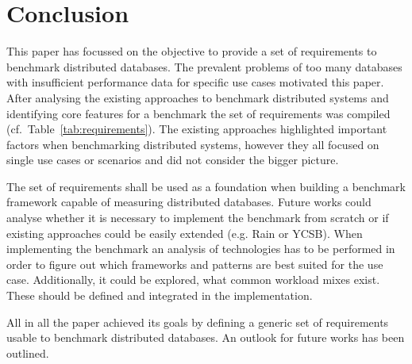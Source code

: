 
\chapter{Conclusion}
\label{cha:conclusion}
This paper has focussed on the objective to provide a set of requirements to benchmark distributed databases. The prevalent problems of too many databases with insufficient performance data for specific use cases motivated this paper. After analysing the existing approaches to benchmark distributed systems and identifying core features for a benchmark the set of requirements was compiled (cf.~Table~\ref{tab:requirements}). The existing approaches highlighted important factors when benchmarking distributed systems, however they all focused on single use cases or scenarios and did not consider the bigger picture.

The set of requirements shall be used as a foundation when building a benchmark framework capable of measuring distributed databases. Future works could analyse whether it is necessary to implement the benchmark from scratch or if existing approaches could be easily extended (e.g. Rain or YCSB). When implementing the benchmark an analysis of technologies has to be performed in order to figure out which frameworks and patterns are best suited for the use case. Additionally, it could be explored, what common workload mixes exist. These should be defined and integrated in the implementation.

All in all the paper achieved its goals by defining a generic set of requirements usable to benchmark distributed databases. An outlook for future works has been outlined.
